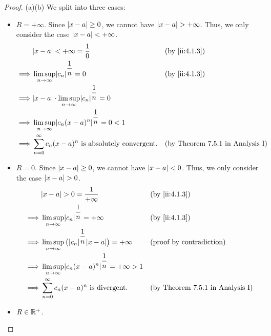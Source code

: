 \begin{proof}{(a)}{(b)}
  We split into three cases:
  \begin{itemize}
    \item \(R = +\infty\).
          Since \(\left\lvert x - a\right\rvert \geq 0\), we cannot have \(\left\lvert x - a\right\rvert > +\infty\).
          Thus, we only consider the case \(\left\lvert x - a\right\rvert < +\infty\).
          \begin{align*}
                     & \abs{x - a} < +\infty = \dfrac{1}{0}                                  &  & \by{ii:4.1.3}                           \\
            \implies & \limsup_{n \to \infty} \abs{c_n}^{\dfrac{1}{n}} = 0                   &  & \by{ii:4.1.3}                           \\
            \implies & \abs{x - a} \cdot \limsup_{n \to \infty} \abs{c_n}^{\dfrac{1}{n}} = 0                                              \\
            \implies & \limsup_{n \to \infty} \abs{c_n (x - a)^n}^{\dfrac{1}{n}} = 0 < 1                                                  \\
            \implies & \sum_{n = 0}^\infty c_n (x - a)^n \text{ is absolutely convergent}.   &  & \text{(by Theorem 7.5.1 in Analysis I)}
          \end{align*}
    \item \(R = 0\).
          Since \(\left\lvert x - a\right\rvert \geq 0\), we cannot have \(\left\lvert x - a\right\rvert < 0\).
          Thus, we only consider the case \(\left\lvert x - a\right\rvert > 0\).
          \begin{align*}
                     & \abs{x - a} > 0 = \dfrac{1}{+\infty}                                            &  & \by{ii:4.1.3}                           \\
            \implies & \limsup_{n \to \infty} \abs{c_n}^{\dfrac{1}{n}} = +\infty                       &  & \by{ii:4.1.3}                           \\
            \implies & \limsup_{n \to \infty} \big(\abs{c_n}^{\dfrac{1}{n}} \abs{x - a}\big) = +\infty &  & \text{(proof by contradiction)}         \\
            \implies & \limsup_{n \to \infty} \abs{c_n (x - a)^n}^{\dfrac{1}{n}} = +\infty > 1                                                      \\
            \implies & \sum_{n = 0}^\infty c_n (x - a)^n \text{ is divergent}.                         &  & \text{(by Theorem 7.5.1 in Analysis I)}
          \end{align*}
    \item \(R \in \mathbb{R}^+\).

\end{itemize}
\end{proof}
